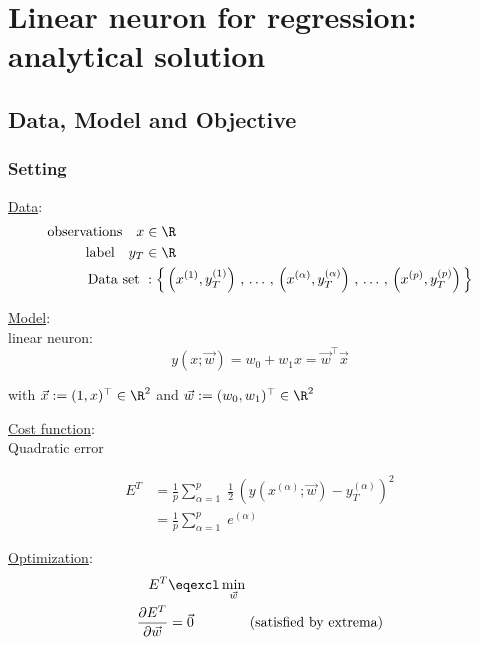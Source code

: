 \section{Linear neuron for regression: analytical solution}

\subsection{Data, Model and Objective}

\begin{frame}\frametitle{Setting}

\underline{Data}:\\

\begin{align*}
\text{observations} \quad x &\in \R \\
\text{label}        \quad y_{T} &\in \R \\
\text{Data set } &: \Big\{
\left(x^{(1)}, y_T^{(1)} 
\right)
\,,\, \ldots \,,\,
\left( x^{(\alpha)}, y_T^{(\alpha)} \right)
\,,\, \ldots \,,\, 
\left( x^{(p)}, y_T^{(p)} \right) 
\Big\}
\end{align*}

\pause

\underline{Model}:\\

linear neuron:
\begin{equation}
    y(x; \vec w) = w_{0} + w_{1} x = \vec w^{\top} \vec x
\end{equation}

with $\vec x := (1, x)^{\top} \in \R^{2}$ and $\vec w := (w_{0}, w_{1})^{\top} \in \R^{2}$

\end{frame}

\begin{frame}

\underline{Cost function}:\\

Quadratic error

\begin{align}
E^{T} &= \frac{1}{p} \sum_{\alpha=1}^{p} \;
\frac{1}{2} \, \left( y(x^{(\alpha)}; \vec w)- y^{(\alpha)}_{T}\right)^{2}\\
&= \frac{1}{p} \sum_{\alpha=1}^{p}
\;e^{(\alpha)}
\end{align}


\pause

\underline{Optimization}:\\

\begin{align}
E^{T} &\eqexcl \min_{\vec w}\\
\frac{\partial E^{T}}{\partial \vec w} &= \vec 0 \qquad\qquad \text{(satisfied by extrema)}
\end{align}
    
\end{frame}

